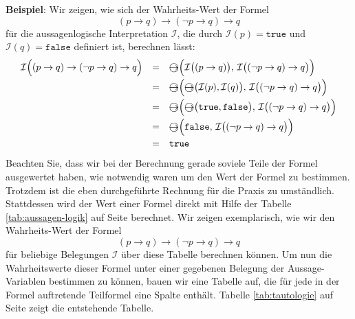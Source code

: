 \noindent
\textbf{Beispiel}: Wir zeigen, wie sich der Wahrheits-Wert der Formel
$$  (p \rightarrow q) \rightarrow (\neg p \rightarrow q) \rightarrow q $$
f\"{u}r die aussagenlogische Interpretation $\mathcal{I}$, die durch 
$\mathcal{I}(p) = \texttt{true}$ und $\mathcal{I}(q) = \texttt{false}$ definiert ist,
berechnen l\"{a}sst: 
\[
  \begin{array}{lcl}
   \mathcal{I}\Bigl( (p \rightarrow q) \rightarrow (\neg p \rightarrow q) \rightarrow q  \Bigr) 
   & = &  \circright\Bigl( \mathcal{I}\bigl( (p \rightarrow q) \bigr),\, \mathcal{I}\bigl((\neg p \rightarrow q) \rightarrow q\bigr) \Bigr) \\[0.2cm]
   & = & \circright\Bigl( \circright\bigl( \mathcal{I}(p), \mathcal{I}(q) \bigr),\, \mathcal{I}\bigl((\neg p \rightarrow q) \rightarrow q\bigr) \Bigr) \\[0.2cm]
   & = & \circright\Bigl( \circright\bigl( \texttt{true}, \texttt{false} \bigr),\, \mathcal{I}\bigl((\neg p \rightarrow q) \rightarrow q\bigr) \Bigr) \\[0.2cm]
   & = & \circright\Bigl( \texttt{false}, \, \mathcal{I}\bigl((\neg p \rightarrow q) \rightarrow q\bigr) \Bigr) \\[0.2cm]
   & = & \texttt{true} \\
 \end{array}
\]
Beachten Sie, dass wir bei der Berechnung gerade soviele Teile der Formel ausgewertet
haben, wie notwendig waren um den Wert der Formel zu bestimmen.  Trotzdem ist die
eben durchgef\"{u}hrte Rechnung f\"{u}r die Praxis zu umst\"{a}ndlich.  Stattdessen wird der Wert
einer Formel direkt mit Hilfe der Tabelle \ref{tab:aussagen-logik} auf Seite
\pageref{tab:aussagen-logik} berechnet.  Wir zeigen exemplarisch, wie wir den
Wahrheits-Wert der Formel
$$  (p \rightarrow q) \rightarrow (\neg p \rightarrow q) \rightarrow q $$
f\"{u}r beliebige Belegungen $\mathcal{I}$ \"{u}ber diese Tabelle berechnen k\"{o}nnen.
 Um nun die Wahrheitswerte 
dieser Formel unter einer gegebenen Belegung der Aussage-Variablen bestimmen zu k\"{o}nnen,
 bauen wir eine  Tabelle auf, die f\"{u}r jede in der Formel
auftretende Teilformel eine Spalte enth\"{a}lt.  Tabelle \ref{tab:tautologie} auf Seite
\pageref{tab:tautologie} zeigt die entstehende Tabelle.
